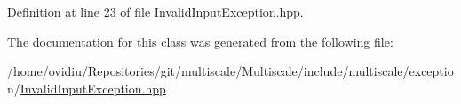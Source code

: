 \-Definition at line 23 of file \-Invalid\-Input\-Exception.\-hpp.



\-The documentation for this class was generated from the following file\-:\begin{DoxyCompactItemize}
\item 
/home/ovidiu/\-Repositories/git/multiscale/\-Multiscale/include/multiscale/exception/\hyperlink{InvalidInputException_8hpp}{\-Invalid\-Input\-Exception.\-hpp}\end{DoxyCompactItemize}
